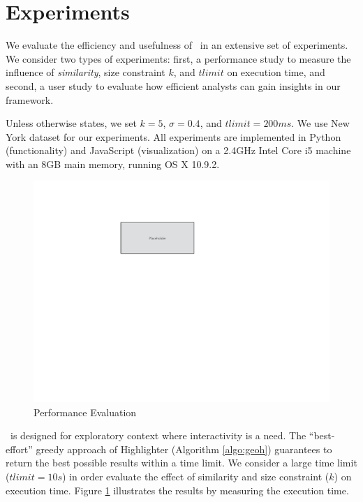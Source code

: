\section{Experiments}
\label{sec:exp}
We evaluate the efficiency and usefulness of \framework\ in an extensive set of experiments. We consider two types of experiments: first, a performance study to measure the influence of {\em similarity}, size constraint $k$, and $tlimit$ on execution time, and second, a user study to evaluate how efficient analysts can gain insights in our framework.

\vspace{5pt}
 Unless otherwise states, we set $k = 5$, $\sigma = 0.4$, and $tlimit = 200ms$. We use New York dataset for our experiments. All experiments are implemented in Python (functionality) and JavaScript (visualization) on a 2.4GHz Intel Core i5 machine with an 8GB main memory, running OS X 10.9.2.

\begin{figure}
  \centering
  \includegraphics[width=\columnwidth]{figs/placeholder}
\caption{Performance Evaluation}
\label{fig:performance}
\end{figure}

\vspace{5pt}
 \framework\ is designed for exploratory context where interactivity is a need. The ``best-effort'' greedy approach of {\sc Highlighter} (Algorithm \ref{algo:geoh}) guarantees to return the best possible results within a time limit. We consider a large time limit ($tlimit = 10s$) in order evaluate the effect of similarity and size constraint ($k$) on execution time. Figure \ref{fig:performance} illustrates the results by measuring the execution time.

